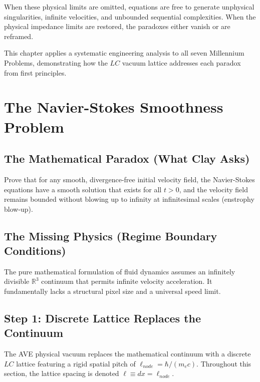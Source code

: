 When these physical limits are omitted, equations are free to generate unphysical singularities, infinite velocities, and unbounded sequential complexities. When the physical impedance limits are restored, the paradoxes either vanish or are reframed.

This chapter applies a systematic engineering analysis to all seven Millennium Problems, demonstrating how the $LC$ vacuum lattice addresses each paradox from first principles.

\section{The Navier-Stokes Smoothness Problem}
\label{sec:ns_millennium}

\subsection{The Mathematical Paradox (What Clay Asks)}
Prove that for any smooth, divergence-free initial velocity field, the Navier-Stokes equations have a smooth solution that exists for all $t > 0$, and the velocity field remains bounded without blowing up to infinity at infinitesimal scales (enstrophy blow-up).

\subsection{The Missing Physics (Regime Boundary Conditions)}
The pure mathematical formulation of fluid dynamics assumes an infinitely divisible $\mathbb{R}^3$ continuum that permits infinite velocity acceleration. It fundamentally lacks a structural pixel size and a universal speed limit.

\subsection{Step 1: Discrete Lattice Replaces the Continuum}
The AVE physical vacuum replaces the mathematical continuum with a discrete $LC$ lattice featuring a rigid spatial pitch of $\ell_{node} = \hbar/(m_e c)$. Throughout this section, the lattice spacing is denoted $\ell \equiv dx = \ell_{node}$.

